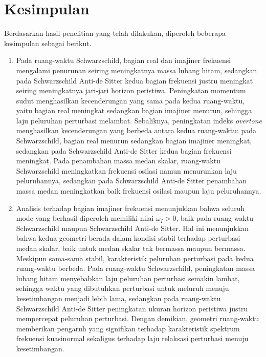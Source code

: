 \section{Kesimpulan}
\label{sec:kesimpulan}

Berdasarkan hasil penelitian yang telah dilakukan, diperoleh beberapa kesimpulan sebagai berikut.

\begin{enumerate}

\item Pada ruang-waktu Schwarzschild, bagian real dan imajiner frekuensi mengalami
penurunan seiring meningkatnya massa lubang hitam, sedangkan pada Schwarzschild Anti-de
Sitter kedua bagian frekuensi justru meningkat seiring meningkatnya jari-jari horizon
peristiwa. Peningkatan momentum sudut menghasilkan kecenderungan yang sama pada kedua
ruang-waktu, yaitu bagian real meningkat sedangkan bagian imajiner menurun, sehingga laju
peluruhan perturbasi melambat. Sebaliknya, peningkatan indeks \textit{overtone}
menghasilkan kecenderungan yang berbeda antara kedua ruang-waktu: pada Schwarzschild,
bagian real menurun sedangkan bagian imajiner meningkat, sedangkan pada Schwarzschild
Anti-de Sitter kedua bagian frekuensi meningkat. Pada penambahan massa medan skalar,
ruang-waktu Schwarzschild meningkatkan frekuensi osilasi namun menurunkan laju
peluruhannya, sedangkan pada Schwarzschild Anti-de Sitter penambahan massa medan
meningkatkan baik frekuensi osilasi maupun laju peluruhannya.

\item Analisis terhadap bagian imajiner frekuensi menunjukkan bahwa seluruh mode yang
berhasil diperoleh memiliki nilai $\omega_I>0$, baik pada ruang-waktu Schwarzschild maupun
Schwarzschild Anti-de Sitter. Hal ini menunjukkan bahwa kedua geometri berada dalam kondisi
stabil terhadap perturbasi medan skalar, baik untuk medan skalar tak bermassa maupun
bermassa. Meskipun sama-sama stabil, karakteristik peluruhan perturbasi pada kedua
ruang-waktu berbeda. Pada ruang-waktu Schwarzschild, peningkatan massa lubang hitam
menyebabkan laju peluruhan perturbasi semakin lambat, sehingga waktu yang dibutuhkan
perturbasi untuk meluruh menuju kesetimbangan menjadi lebih lama, sedangkan pada
ruang-waktu Schwarzschild Anti-de Sitter peningkatan ukuran horizon peristiwa justru
mempercepat peluruhan perturbasi. Dengan demikian, geometri ruang-waktu memberikan
pengaruh yang signifikan terhadap karakteristik spektrum frekuensi kuasinormal sekaligus
terhadap laju relaksasi perturbasi menuju kesetimbangan.

\end{enumerate}